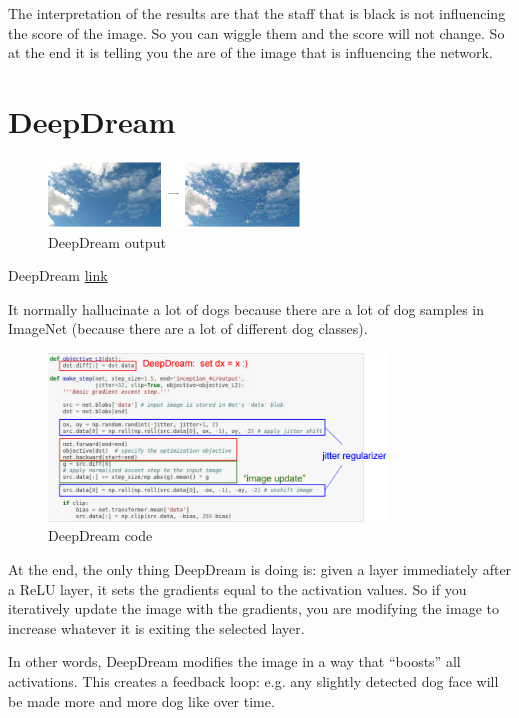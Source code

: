 The interpretation of the results are that the staff that is black is not influencing the score of the image. So you can wiggle them and the score will not change. So at the end it is telling you the are of the image that is influencing the network.

\section{DeepDream}

\begin{figure}[h]
  \centering
  \includegraphics[width=0.6\textwidth]{Images/visualization/13.png}
  \caption{DeepDream output}
\end{figure}

DeepDream \href{http://cs.stanford.edu/people/karpathy/cnnembed/}{link} 

It normally hallucinate a lot of dogs because there are a lot of dog samples in ImageNet (because there are a lot of different dog classes).

\begin{figure}[h]
  \centering
  \includegraphics[width=0.8\textwidth]{Images/visualization/12.png}
  \caption{DeepDream code}
\end{figure}

At the end, the only thing DeepDream is doing is: given a layer immediately after a ReLU layer, it sets the gradients equal to the activation values. So if you iteratively update the image with the gradients, you are modifying the image to increase whatever it is exiting the selected layer.

In other words, DeepDream modifies the image in a way that ``boosts” all activations. This creates a feedback loop: e.g. any slightly detected dog face will be made more and more dog like over time.

